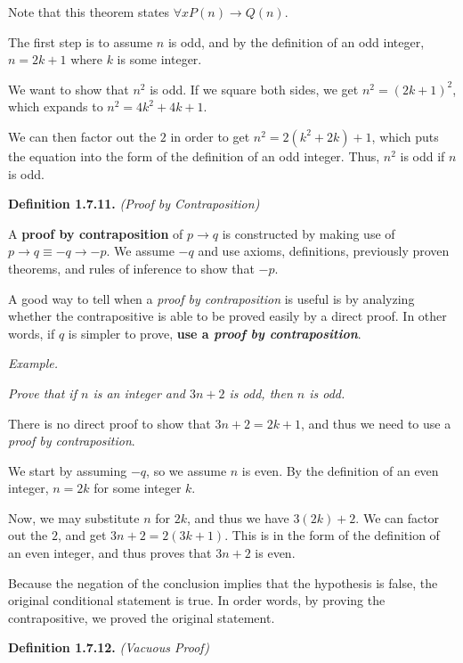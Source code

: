 \documentclass[12pt, letterpaper]{article}
\begin{document}
Note that this theorem states $ \forall x P(n) \rightarrow Q(n) $.

The first step is to assume $ n $ is odd, and by the definition of an odd integer, $ n = 2k + 1 $ where $ k $ is some integer.

We want to show that $ n^2 $ is odd. If we square both sides, we get $ n^2 = (2k + 1)^2 $, which expands to $ n^2 = 4k^2 + 4k + 1 $.

We can then factor out the $ 2 $ in order to get $  n^2 = 2(k^2 + 2k) + 1 $, which puts the equation into the form of the definition of an odd integer. Thus, $ n^2 $ is odd if $ n $ is odd.

\bigskip
\bigskip

\textbf{Definition 1.7.11.} \textit{(Proof by Contraposition)}
\medskip

A \textbf{proof by contraposition} of $ p \rightarrow q $ is constructed by making use of $ p \rightarrow q \equiv -q \rightarrow -p $. We assume $ -q $ and use axioms, definitions, previously proven theorems, and rules of inference to show that $ -p $.
\medskip

A good way to tell when a \textit{proof by contraposition} is useful is by analyzing whether the contrapositive is able to be proved easily by a direct proof. In other words, if $ q $ is simpler to prove, \textbf{use a \textit{proof by contraposition}}.
\bigskip

\textit{Example.}
\medskip

\textit{Prove that if $ n $ is an integer and $ 3n + 2 $ is odd, then $ n $ is odd.}
\medskip

There is no direct proof to show that $ 3n + 2 = 2k + 1 $, and thus we need to use a \textit{proof by contraposition}.
\medskip

We start by assuming $ -q $, so we assume $ n $ is even. By the definition of an even integer, $ n = 2k $ for some integer $ k $.
\medskip

Now, we may substitute $ n $ for $ 2k $, and thus we have $ 3(2k) + 2 $. We can factor out the $ 2 $, and get $ 3n + 2 = 2(3k + 1) $. This is in the form of the definition of an even integer, and thus proves that $ 3n + 2 $ is even.
\medskip

Because the negation of the conclusion implies that the hypothesis is false, the original conditional statement is true. In order words, by proving the contrapositive, we proved the original statement.

\bigskip
\bigskip

\textbf{Definition 1.7.12.} \textit{(Vacuous Proof)}
\medskip
\end{document}
